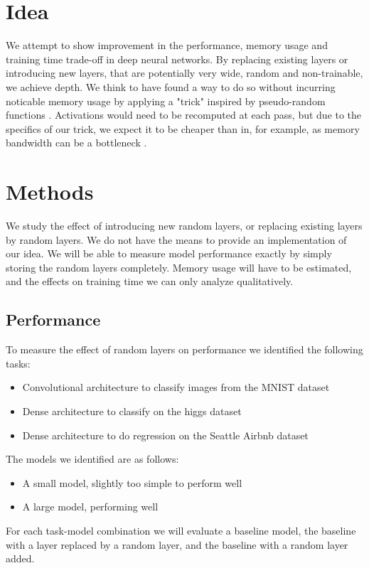 \documentclass[]{article}
\begin{document}
\begin{multicols}{2}
	\section{Idea}
	We attempt to show improvement in the performance, memory usage and training time trade-off in deep neural networks. By replacing existing layers or introducing new layers, that are potentially very wide, random and non-trainable, we achieve depth. We think to have found a way to do so without incurring noticable memory usage by applying a "trick" inspired by pseudo-random functions \cite{Goldreich_Goldwasser_Micali_1986}. Activations would need to be recomputed at each pass, but due to the specifics of our trick, we expect it to be cheaper than in, for example, \cite{DBLP:journals/corr/GruslysMDLG16} as memory bandwidth can be a bottleneck \cite{Li_Shen_Dou_Ni_Xu_Yang_Wang_Niu_2019}.
	
	\section{Methods}
	We study the effect of introducing new random layers, or replacing existing layers by random layers. We do not have the means to provide an implementation of our idea. We will be able to measure model performance exactly by simply storing the random layers completely. Memory usage will have to be estimated, and the effects on training time we can only analyze qualitatively.
	
	\subsection{Performance}
	To measure the effect of random layers on performance we identified the following tasks:
	\begin{itemize}
		\itemsep0em
		\item Convolutional architecture to classify images from the MNIST dataset
		\item Dense architecture to classify on the higgs dataset
		\item Dense architecture to do regression on the Seattle Airbnb dataset
	\end{itemize}
	The models we identified are as follows:
	\begin{itemize}
		\itemsep0em
		\item A small model, slightly too simple to perform well
		\item A large model, performing well
	\end{itemize}
	For each task-model combination we will evaluate a baseline model, the baseline with a layer replaced by a random layer, and the baseline with a random layer added.
	

\end{multicols}
\end{document}

